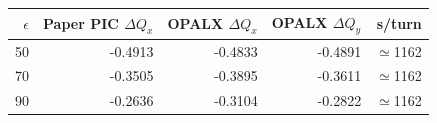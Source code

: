 \begin{tabular}{rrrrr}
\toprule
$\epsilon$ & Paper PIC $\Delta Q_x$ & OPALX $\Delta Q_x$ & OPALX $\Delta Q_y$ & s/turn \\
\midrule
50 & -0.4913 & -0.4833 & -0.4891 & $\simeq$1162 \\
70 & -0.3505 & -0.3895 & -0.3611 & $\simeq$1162 \\
90 & -0.2636 & -0.3104 & -0.2822 & $\simeq$1162 \\
\bottomrule
\end{tabular}
